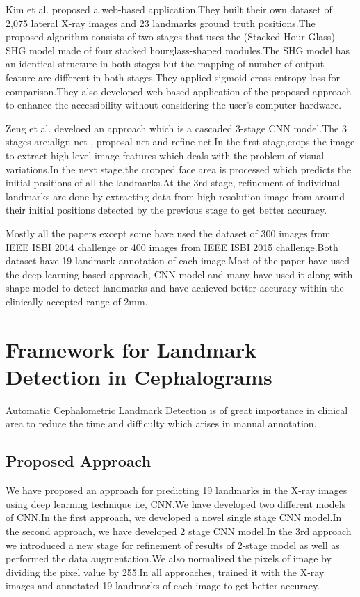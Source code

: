 \documentclass[sn-mathphys]{sn-jnl}%
\theoremstyle{thmstyleone}%
\theoremstyle{thmstyletwo}%
\theoremstyle{thmstylethree}%
\begin{document}
\par Kim et al. \cite{kim2020web} proposed a web-based application.They built their own dataset  of 2,075 lateral X-ray images and 23 landmarks ground truth positions.The proposed algorithm consists of two stages that uses the (Stacked Hour Glass) SHG model made of four stacked hourglass-shaped modules.The SHG model has an identical structure in both stages but the mapping of number of output feature are different in both stages.They applied sigmoid cross-entropy loss for comparison.They also developed web-based application of the proposed approach to enhance the accessibility without considering the user’s computer hardware.

\par Zeng et al.  \cite{zeng2021cascaded} develoed an approach which is a cascaded 3-stage CNN model.The 3 stages are:align net , proposal net and refine net.In the first stage,crops the image to extract high-level image features which deals with the problem of visual variations.In the next stage,the cropped face area is processed which predicts the initial positions of all the landmarks.At the 3rd stage, refinement of individual landmarks are done by  extracting data from high-resolution image from around their initial positions detected by the previous stage to get better accuracy. 


\par Mostly all the papers except some have used the dataset of 300 images from IEEE ISBI 2014 challenge \cite{wang2015evaluation} or 400 images from IEEE ISBI 2015 challenge.Both dataset have 19 landmark annotation of each image.Most of the paper have used the deep learning based approach, CNN model \cite{nishimoto2019personal} and many have used it along with shape model \cite{arik2017fully} to detect landmarks and have achieved better accuracy within the clinically accepted range of 2mm.

\section{Framework for Landmark Detection in Cephalograms}\label{Dataset}

Automatic Cephalometric Landmark Detection is of great importance in clinical area to reduce the time and difficulty which arises in manual annotation.


\subsection{Proposed Approach}
We have proposed an approach for predicting 19 landmarks in the X-ray images using deep learning technique i.e, CNN.We have  developed two different models of CNN.In the first approach, we developed a novel single stage CNN model.In the second approach, we have developed 2 stage CNN model.In the 3rd approach we introduced a new stage for refinement of results of 2-stage model as well as performed the data augmentation.We also normalized the pixels of image by dividing the pixel value by 255.In all approaches, trained it with the X-ray images and annotated 19 landmarks of each image to get better accuracy.
\end{document}
